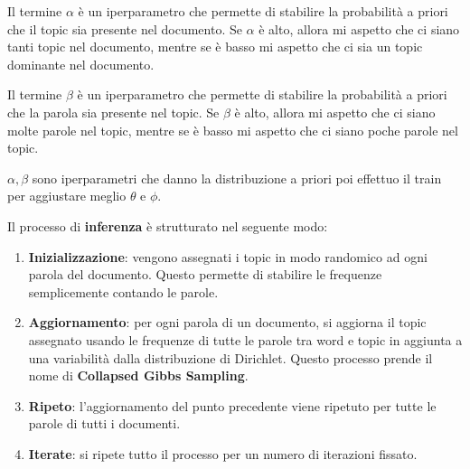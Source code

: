 Il termine $\alpha$ è un iperparametro che permette di stabilire la probabilità
a priori che il topic sia presente nel documento. Se $\alpha$ è alto, allora mi
aspetto che ci siano tanti topic nel documento, mentre se è basso mi aspetto che
ci sia un topic dominante nel documento.

Il termine $\beta$ è un iperparametro che permette di stabilire la probabilità
a priori che la parola sia presente nel topic. Se $\beta$ è alto, allora mi aspetto
che ci siano molte parole nel topic, mentre se è basso mi aspetto che ci siano
poche parole nel topic.

$\alpha, \beta$ sono iperparametri che danno la distribuzione a priori poi effettuo
il train per aggiustare meglio $\theta$ e $\phi$.

Il processo di \textbf{inferenza} è strutturato nel seguente modo:
\begin{enumerate}
      \item \textbf{Inizializzazione}: vengono assegnati i topic in modo randomico
            ad ogni parola del documento. Questo permette di stabilire le
            frequenze semplicemente contando le parole.
      \item \textbf{Aggiornamento}: per ogni parola di un documento, si aggiorna
            il topic assegnato usando le frequenze di tutte le parole tra word e
            topic in aggiunta a una variabilità dalla distribuzione di Dirichlet.
            Questo processo prende il nome di \textbf{Collapsed Gibbs Sampling}.
      \item \textbf{Ripeto}: l'aggiornamento del punto precedente viene ripetuto
            per tutte le parole di tutti i documenti.
      \item \textbf{Iterate}: si ripete tutto il processo per un numero di iterazioni
            fissato.
\end{enumerate}

